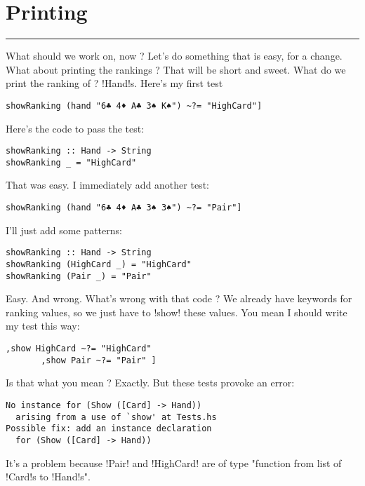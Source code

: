 \newpage
\section{Printing} 
\vspace{10cm}
\hrule

\lhQ What should we work on, now ?
\lhA Let's do something that is easy, for a change.
\lhN What about printing the rankings ?
\lhA That will be short and sweet.
\lhN What do we print the ranking of ?
\lhA \il!Hand!s.
\lhN Here's my first test
\begin{lstlisting}[frame=single]
 showRanking (hand "6♣ 4♦ A♣ 3♠ K♠") ~?= "HighCard"]
\end{lstlisting} %
\lhA Here's the code to pass the test:
\begin{lstlisting}[frame=single]
showRanking :: Hand -> String
showRanking _ = "HighCard"
\end{lstlisting}
\success That was easy.
\lhN I immediately add another test:
\begin{lstlisting}[frame=single]
 showRanking (hand "6♣ 4♦ A♣ 3♠ 3♠") ~?= "Pair"]
\end{lstlisting}
\lhA I'll just add some patterns:
\begin{lstlisting}[frame=single]
showRanking :: Hand -> String
showRanking (HighCard _) = "HighCard"
showRanking (Pair _) = "Pair"
\end{lstlisting}
\success Easy. And wrong.
\lhN What's wrong with that code ?
\lhA We already have keywords for ranking values, so we just have to \il!show! these values.
\lhN You mean I should write my test this way:
\begin{lstlisting}[frame=single]
       ,show HighCard ~?= "HighCard"
       ,show Pair ~?= "Pair" ]
\end{lstlisting}
Is that what you mean ?
\lhA \error Exactly.
\lhN But these tests provoke an error:
\begin{small}
\begin{verbatim}
No instance for (Show ([Card] -> Hand))
  arising from a use of `show' at Tests.hs
Possible fix: add an instance declaration 
  for (Show ([Card] -> Hand))
\end{verbatim}
\end{small}
\lhA It's a problem because \il!Pair! and \il!HighCard! are of type "function from list of \il!Card!s to \il!Hand!s". 
